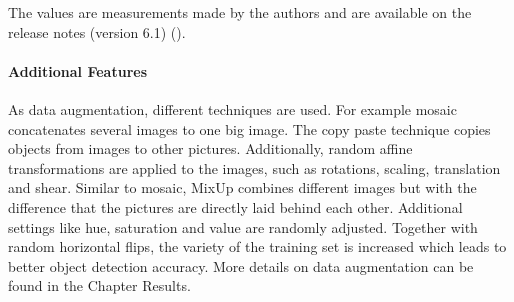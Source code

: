 The values are measurements made by the authors and are available on the release notes (version 6.1) (\cite{release_current}).

\paragraph{Additional Features}
As data augmentation, different techniques are used. For example mosaic concatenates several images to one big image. The copy paste technique copies objects from images to other pictures.  Additionally, random affine transformations are applied to the images, such as rotations, scaling, translation and shear. Similar to mosaic, MixUp combines different images but with the difference that the pictures are directly laid behind each other. Additional settings like hue, saturation and value are randomly adjusted. Together with random horizontal flips, the variety of the training set is increased which leads to better object detection accuracy. More details on data augmentation can be found in the Chapter Results.
